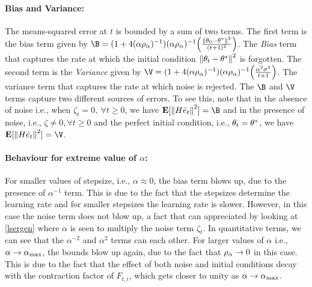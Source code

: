 \paragraph{Bias and Variance:} The means-squared error at $t$ is bounded by a sum of two terms. The first term is the bias term given by $\B=(1+4(\alpha\rho_{\alpha})^{-1}) (\alpha\rho_{\alpha})^{-1} \Big(\frac{\norm{\theta_0-\ts}^2}{(t+1)^2}\Big)$.  The \emph{Bias} term that captures the rate at which the initial condition $\left\| \theta_t-\theta^*\right\|^2$ is forgotten. The second term is the \emph{Variance} given by $\V=(1+4(\alpha\rho_{\alpha})^{-1}) (\alpha\rho_{\alpha})^{-1} \Big(\frac{\alpha^2\sigma^2}{t+1} \Big)$. The variance term that captures the rate at which noise is rejected. The $\B$ and $\V$ terms capture two different sources of errors. To see this, note that in the absence of noise i.e., when $\zeta_t=0,~\forall t\geq 0$, we have $\E[\norm{H\eb_t}^2]=\B$ and in the presence of noise, i.e., $\zeta\neq 0,\forall t\geq 0$ and the perfect initial condition, i.e., $\theta_t=\theta^*$, we have $\E[\norm{H\eb_t}^2]=\V$.
\paragraph{Behaviour for extreme value of $\alpha$:} For smaller values of stepsize, i.e., $\alpha\approx 0$, the bias term blows up, due to the presence of $\alpha^{-1}$ term. This is due to the fact that the stepsizes determine the learning rate and for smaller stepsizes the learning rate is slower. However, in this case the noise term does not blow up, a fact that can appreciated by looking at \eqref{lsergen} where $\alpha$ is seen to multiply the noise term $\zeta_t$. In quantitative terms, we can see that the $\alpha^{-2}$ and $\alpha^2$ terms can each other. For larger values of $\alpha$ i.e., $\alpha\rightarrow \alpha_{\max}$, the bounds blow up again, due to the fact that $\rho_{\alpha}\rightarrow 0$ in this case. This is due to the fact that the effect of both noise and initial conditions decay with the contraction factor of $F_{t,i}$, which gets closer to unity as $\alpha\rightarrow\alpha_{\max}$.

